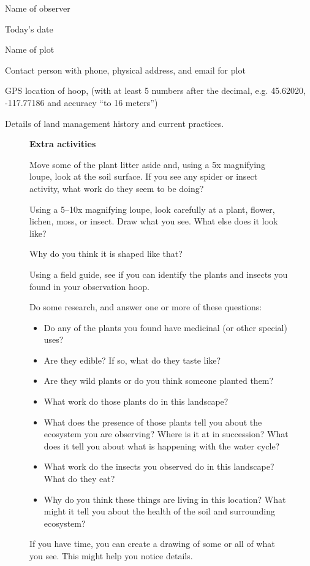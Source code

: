 \documentclass[11pt,letterpaper,twoside,onecolumn]{memoir}
\begin{document}
\begin{checkboxlist}

\item Name of observer
\item Today's date
\item Name of plot
\item Contact person with phone, physical address, and email for plot
\item GPS location of hoop, (with at least 5 numbers after the decimal, e.g. 45.62020, -117.77186 and accuracy ``to 16 meters'')
\item Details of land management history and current practices.
\end{checkboxlist}

\begin{figure}
\begin{tcolorbox}
\setlength{\parskip}{.7em}

\textbf{Extra activities}

Move some of the plant litter aside and, using a 5x magnifying loupe, look at the soil surface. If you see any spider or insect activity, what work do they seem to be doing?

Using a 5--10x magnifying loupe, look carefully at a plant, flower, lichen, moss, or insect. Draw what you see. 
What else does it look like?

Why do you think it is shaped like that?

Using a field guide, see if you can identify the plants and insects you found in your observation hoop. 

Do some research, and answer one or more of these questions:
\begin{itemize}
\item Do any of the plants you found have medicinal (or other special) uses? 
\item Are they edible? If so, what do they taste like?
\item Are they wild plants or do you think someone planted them?
\item What work do those plants do in this landscape?
\item What does the presence of those plants tell you about the ecosystem you are observing? Where is it at in succession? What does it tell you about what is happening with the water cycle?
\item What work do the insects you observed do in this landscape? What do they eat?
\item Why do you think these things are living in this location? What might it tell you about the health of the soil and surrounding ecosystem?
\end{itemize}
If you have time, you can create a drawing of some or all of what you see. This might help you notice details.
\end{tcolorbox}
\end{figure}
\end{document}
